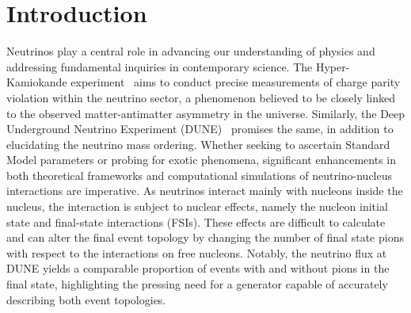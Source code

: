 \section{\label{sec:1-intro}Introduction}

Neutrinos play a central role in advancing our understanding of physics and addressing fundamental inquiries in contemporary science. The Hyper-Kamiokande experiment~\cite{Hyper-Kamiokande:2018ofw} aims to conduct precise measurements of charge parity violation within the neutrino sector, a phenomenon believed to be closely linked to the observed matter-antimatter asymmetry in the universe. Similarly, the Deep Underground Neutrino Experiment (DUNE)~\cite{DUNE:2016hlj,DUNE:2015lol,DUNE:2016evb,DUNE:2016rla,DUNE:2021tad}  promises the same, in addition to elucidating the neutrino mass ordering. Whether seeking to ascertain Standard Model parameters or probing for exotic phenomena, significant enhancements in both theoretical frameworks and computational simulations of neutrino-nucleus interactions are imperative. As neutrinos interact mainly with nucleons inside the nucleus, the interaction is subject to nuclear effects, namely the nucleon initial state and final-state interactions (FSIs). These effects are difficult to calculate and can alter the final event topology by changing the number of final state pions with respect to the interactions on free nucleons. Notably, the neutrino flux at DUNE yields a comparable proportion of events with and without pions in the final state, highlighting the pressing need for a generator capable of accurately describing both event topologies.

